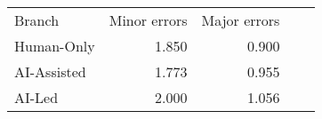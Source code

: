 \begin{tabular}{lrrrr}
\hline\hline
Branch & Minor errors & Major errors \\
Human-Only & 1.850 & 0.900 \\
AI-Assisted & 1.773 & 0.955 \\
AI-Led & 2.000 & 1.056 \\
\hline\hline
\end{tabular}
